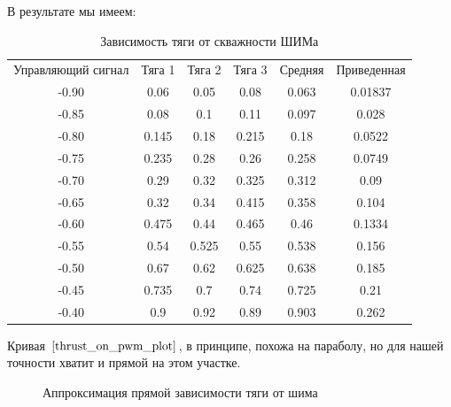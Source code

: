 \documentclass[a4paper]{article}
\begin{document}
В результате мы имеем:

\begin{table}[h]
	\caption{Зависимость тяги от скважности ШИМа}
	\label{thrust_on_pwm_data}
	\begin{center}
		\begin{tabular}{cccccc}
			Управляющий сигнал &  Тяга 1 & Тяга 2 & Тяга 3 & Средняя & Приведенная \\
			-0.90 & 0.06 & 0.05 & 0.08 & 0.063 & 0.01837 \\
			-0.85 & 0.08 & 0.1 & 0.11 & 0.097 & 0.028 \\
			-0.80 & 0.145 & 0.18 & 0.215 & 0.18 & 0.0522 \\
			-0.75 & 0.235 & 0.28 & 0.26 & 0.258 & 0.0749 \\
			-0.70 & 0.29 & 0.32 & 0.325 & 0.312 & 0.09 \\
			-0.65 & 0.32 & 0.34 & 0.415 & 0.358 & 0.104 \\
			-0.60 & 0.475 & 0.44 & 0.465 & 0.46 & 0.1334 \\
			-0.55 & 0.54 & 0.525 & 0.55 & 0.538 & 0.156 \\
			-0.50 & 0.67 & 0.62 & 0.625 & 0.638 & 0.185 \\
			-0.45 & 0.735 & 0.7 & 0.74 & 0.725 & 0.21 \\
			-0.40 & 0.9 & 0.92 & 0.89 & 0.903 & 0.262 \\
		\end{tabular}
	\end{center}
\end{table}

Кривая $\ref{thrust_on_pwm_plot}$, в принципе, похожа на параболу, но для нашей точности хватит и прямой на этом участке.

\begin{figure}[h]
	\caption{Аппроксимация прямой зависимости тяги от шима}
	\label{thrust_on_pwm_plot}
\end{figure}
\end{document}
